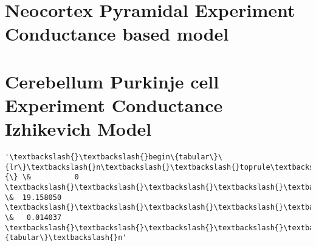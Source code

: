     \hypertarget{neocortex-pyramidal-experiment-conductance-based-model}{%
\section{Neocortex Pyramidal Experiment Conductance based
model}\label{neocortex-pyramidal-experiment-conductance-based-model}}

    \hypertarget{cerebellum-purkinje-cell-experiment-conductance-izhikevich-model}{%
\section{Cerebellum Purkinje cell Experiment Conductance Izhikevich
Model}\label{cerebellum-purkinje-cell-experiment-conductance-izhikevich-model}}


            \begin{tcolorbox}[breakable, size=fbox, boxrule=.5pt, pad at break*=1mm, opacityfill=0]
\begin{Verbatim}[commandchars=\\\{\}]
'\textbackslash{}\textbackslash{}begin\{tabular\}\{lr\}\textbackslash{}n\textbackslash{}\textbackslash{}toprule\textbackslash{}n\{\} \&          0 \textbackslash{}\textbackslash{}\textbackslash{}\textbackslash{}\textbackslash{}n\textbackslash{}\textbackslash{}midrule\textbackslash{}nchi\textbackslash{}\textbackslash{}\_square
\&  19.158050 \textbackslash{}\textbackslash{}\textbackslash{}\textbackslash{}\textbackslash{}np\textbackslash{}\textbackslash{}\_value    \&   0.014037
\textbackslash{}\textbackslash{}\textbackslash{}\textbackslash{}\textbackslash{}n\textbackslash{}\textbackslash{}bottomrule\textbackslash{}n\textbackslash{}\textbackslash{}end\{tabular\}\textbackslash{}n'
\end{Verbatim}
\end{tcolorbox}
        
